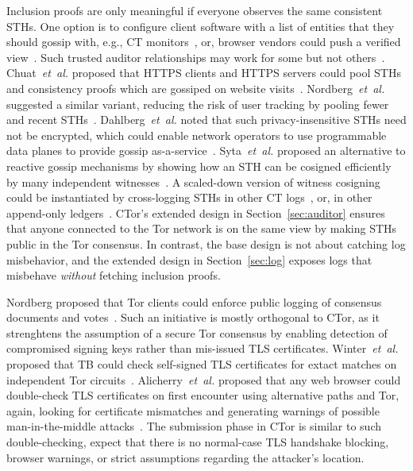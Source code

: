 Inclusion proofs are only meaningful if everyone observes the same consistent
STHs.
One option is to configure client software with a list of entities that they
should gossip with, e.g., CT monitors~\cite{chase}, or,
browser vendors could push a verified view~\cite{sth-push}.
Such trusted auditor relationships may work for some but not
others~\cite{nordberg}.
Chuat~\emph{et~al.} proposed that HTTPS clients and HTTPS servers could pool
STHs and consistency proofs which are gossiped on website visits~\cite{chuat}.
Nordberg~\emph{et~al.} suggested a similar variant, reducing the risk of user
tracking by pooling fewer and recent STHs~\cite{nordberg}.
Dahlberg~\emph{et~al.} noted that such privacy-insensitive STHs need not be
encrypted, which could enable network operators to use programmable data planes
to provide gossip as-a-service~\cite{dahlberg}.
Syta~\emph{et~al.} proposed an alternative to reactive gossip mechanisms by
showing how an STH can be cosigned efficiently by many independent
witnesses~\cite{syta}.
A scaled-down version of witness cosigning could be instantiated by
cross-logging STHs in other CT logs~\cite{minimal-gossip},
or, in other append-only ledgers~\cite{catena}.
CTor's extended design in Section~\ref{sec:auditor} ensures that anyone
connected to the Tor network is on the same view by making STHs public in the
Tor consensus.  In contrast, the base design is not about catching log
misbehavior, and the extended design in Section~\ref{sec:log} exposes logs
that misbehave \emph{without} fetching inclusion proofs.

Nordberg proposed that Tor clients could enforce public logging of consensus
documents and votes~\cite{consensus-transparency}.  Such an initiative is
mostly orthogonal to CTor, as it strenghtens the assumption of a secure Tor
consensus by enabling detection of compromised signing keys rather than
mis-issued TLS certificates.  Winter~\emph{et~al.} proposed that TB
could check self-signed TLS certificates for extact matches on independent Tor
circuits~\cite{spoiled-onions}.  Alicherry~\emph{et~al.} proposed that any web browser could
double-check TLS certificates on first encounter using alternative paths and
Tor, again, looking for certificate mismatches and generating warnings of
possible man-in-the-middle attacks~\cite{doublecheck}.  The submission phase in
CTor is similar to such double-checking, expect that there is no normal-case TLS
handshake blocking, browser warnings, or strict assumptions regarding the
attacker's location.
